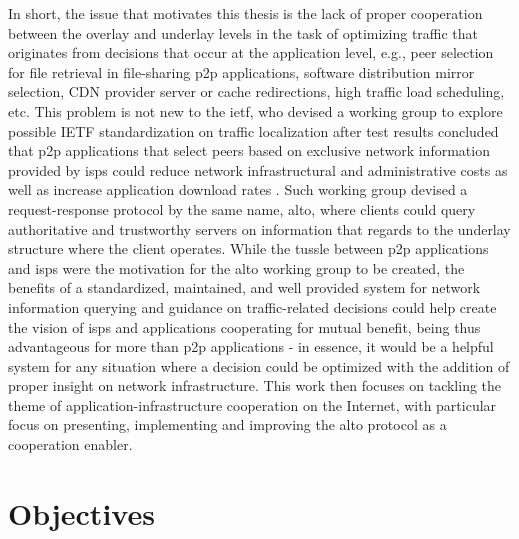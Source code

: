     In short, the issue that motivates this thesis is the lack of proper cooperation between the overlay and underlay levels in the task of optimizing traffic that originates from decisions that occur at the application level, e.g., peer selection for file retrieval in file-sharing \gls{p2p} applications, software distribution mirror selection, CDN provider server or cache redirections, high traffic load scheduling, etc.
    This problem is not new to the \gls{ietf}, who devised a working group to explore possible IETF standardization on traffic localization after test results concluded that \gls{p2p} applications that select peers based on exclusive network information provided by \glspl{isp} could reduce network infrastructural and administrative costs as well as increase application download rates \cite{seedorf2009}.
    Such working group devised a request-response protocol by the same name, \gls{alto}, where clients could query authoritative and trustworthy servers on information that regards to the underlay structure where the client operates.
    While the tussle between \gls{p2p} applications and \glspl{isp} were the motivation for the \gls{alto} working group to be created, the benefits of a standardized, maintained, and well provided system for network information querying and guidance on traffic-related decisions could help create the vision of \glspl{isp} and applications cooperating for mutual benefit, being thus advantageous for more than \gls{p2p} applications - in essence, it would be a helpful system for any situation where a decision could be optimized with the addition of proper insight on network infrastructure.
    This work then focuses on tackling the theme of application-infrastructure cooperation on the Internet, with particular focus on presenting, implementing and improving the \gls{alto} protocol as a cooperation enabler.

\section{Objectives}

